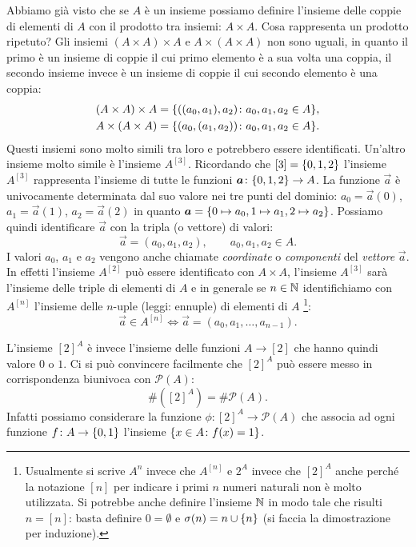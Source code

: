 Abbiamo già visto che se $A$ è un insieme possiamo definire l'insieme 
delle coppie di elementi di $A$ con il prodotto tra insiemi: $A\times A$. 
Cosa rappresenta un prodotto ripetuto?
Gli insiemi $(A\times A)\times A$ e $A\times(A\times A)$ non sono 
uguali, in quanto il primo è un insieme di coppie il cui primo elemento 
è a sua volta una coppia, il secondo insieme invece è un insieme di coppie 
il cui secondo elemento è una coppia:
\begin{gather*}
  (A\times A)\times A = {\left\{ ((a_0,a_1),a_2)\colon a_0,a_1,a_2\in A \right\}},
  \\
  A \times (A\times A) = {\left\{ (a_0,(a_1,a_2))\colon a_0,a_1,a_2\in A \right\}}.
\end{gather*}
Questi insiemi sono molto simili tra loro e potrebbero essere identificati.
Un'altro insieme molto simile è l'insieme $A^{[3]}$.  
Ricordando che $[3] = {\left\{ 0,1,2 \right\}}$ l'insieme 
$A^{[3]}$ rappresenta l'insieme di tutte le funzioni $\boldsymbol a\colon {\left\{ 0,1,2 \right\}}\to A$.
La funzione $\vec a$ è univocamente determinata dal suo valore nei 
tre punti del dominio: $a_0 = \vec a(0)$, $a_1=\vec a(1)$, $a_2=\vec a(2)$
in quanto $\boldsymbol a = {\left\{ 0\mapsto a_0, 1\mapsto a_1, 2\mapsto a_2 \right\}}$.
Possiamo quindi identificare $\vec a$ con la tripla (o vettore) di valori:
\[
  \vec a = (a_0, a_1, a_2), \qquad a_0,a_1,a_2 \in A.  
\]
I valori $a_0$, $a_1$ e $a_2$ vengono anche chiamate \emph{coordinate}
o \emph{componenti} del \emph{vettore} $\vec a$.
%
%
%
%
%
In effetti l'insieme $A^{[2]}$ può essere identificato con $A\times A$, l'insieme 
$A^{[3]}$ sarà l'insieme delle triple di elementi di $A$ e in generale se $n\in{\mathbb N}$ 
identifichiamo con $A^{[n]}$ l'insieme delle $n$-uple (leggi: ennuple) di elementi 
%
di $A$%
\footnote{
  Usualmente si scrive $A^n$ invece che $A^{[n]}$ e $2^A$ invece che $[2]^A$ 
  anche perché la notazione $[n]$ per indicare i primi $n$ numeri naturali 
  non è molto utilizzata.
  Si potrebbe anche definire l'insieme ${\mathbb N}$ in modo tale che 
  risulti $n=[n]$: basta definire $0=\emptyset$ e $\sigma(n) = n\cup {\left\{ n \right\}}$
  (si faccia la dimostrazione per induzione).
}:
\[
   \vec a \in A^{[n]} \iff 
   \vec a = (a_0, a_1, \dots, a_{n-1}).  
\]

L'insieme $[2]^A$ è invece l'insieme delle funzioni $A\to [2]$ che hanno 
quindi valore $0$ o $1$. 
Ci si può convincere facilmente che $[2]^A$ può essere messo in corrispondenza 
biunivoca con $\mathcal P(A)$:
\[
    \# ([2]^A) = \# \mathcal P(A).
\]
Infatti possiamo considerare la funzione $\phi\colon [2]^A \to \mathcal P(A)$
che associa ad ogni funzione $f\colon A\to {\left\{ 0,1 \right\}}$
l'insieme ${\left\{ x\in A \colon f(x)=1 \right\}}$.

